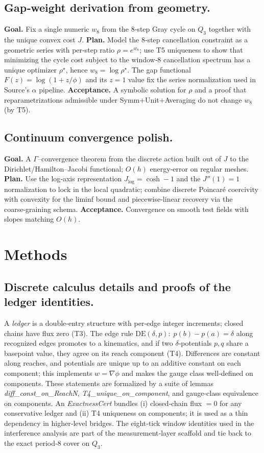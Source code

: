\documentclass[12pt,a4paper]{article}
\theoremstyle{definition}
\theoremstyle{remark}
\begin{document}
\subsection{Gap‑weight derivation from geometry.}
\textbf{Goal.} Fix a single numeric \(w_8\) from the \(8\)‑step Gray cycle on \(Q_3\) together with the unique convex cost \(J\).  
\textbf{Plan.} Model the \(8\)‑step cancellation constraint as a geometric series with per‑step ratio \(\rho=e^{w_8}\); use T5 uniqueness to show that minimizing the cycle cost subject to the window‑\(8\) cancellation spectrum has a unique optimizer \(\rho^\star\), hence \(w_8=\log\rho^\star\). The gap functional \(F(z)=\log(1+z/\phi)\) and its \(z=1\) value fix the series normalization used in Source's \(\alpha\) pipeline.  
\textbf{Acceptance.} A symbolic solution for \(\rho\) and a proof that reparametrizations admissible under Symm+Unit+Averaging do not change \(w_8\) (by T5).

\subsection{Continuum convergence polish.}
\textbf{Goal.} A \(\Gamma\)–convergence theorem from the discrete action built out of \(J\) to the Dirichlet/Hamilton–Jacobi functional; \(O(h)\) energy‑error on regular meshes.  
\textbf{Plan.} Use the log‑axis representation \(J_{\log}=\cosh-1\) and the \(J''(1)=1\) normalization to lock in the local quadratic; combine discrete Poincaré coercivity with convexity for the liminf bound and piecewise‑linear recovery via the coarse‑graining schema.  
\textbf{Acceptance.} Convergence on smooth test fields with slopes matching \(O(h)\). 

\section{Methods}

\subsection{Discrete calculus details and proofs of the ledger identities.}
A \emph{ledger} is a double‑entry structure with per‑edge integer increments; closed chains have flux zero (T3). The edge rule \(\mathrm{DE}(\delta,p):\;p(b)-p(a)=\delta\) along recognized edges promotes to a kinematics, and if two \(\delta\)‑potentials \(p,q\) share a basepoint value, they agree on its reach component (T4). Differences are constant along reaches, and potentials are unique up to an additive constant on each component; this implements \(w=\nabla\phi\) and makes the gauge class well‑defined on components. These statements are formalized by a suite of lemmas \emph{diff\_const\_on\_ReachN}, \emph{T4\_unique\_on\_component}, and gauge‑class equivalence on components. An \emph{ExactnessCert} bundles (i) closed‑chain flux \(=0\) for any conservative ledger and (ii) T4 uniqueness on components; it is used as a thin dependency in higher‑level bridges. The eight‑tick window identities used in the interference analysis are part of the measurement‑layer scaffold and tie back to the exact period‑\(8\) cover on \(Q_3\). 
\end{document}
